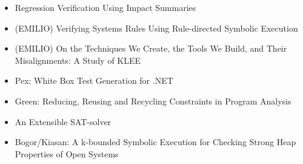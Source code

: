 \documentclass[10pt, a4paper]{article}
\begin{document}
\begin{itemize}
  \item \cite{BPR-SPIN13} Regression Verification Using Impact Summaries
  \item (EMILIO) \cite{CHW-ASPLOS13} Verifying Systems Rules Using Rule-directed Symbolic Execution
  \item \cite{RED-ICSE16} (EMILIO) On the Techniques We Create, the Tools We Build, and Their Misalignments: A Study of KLEE
  \item \cite{PEX-TAP08} Pex: White Box Test Generation for .NET
  \item \cite{VGD-FSE12} Green: Reducing, Reusing and Recycling Constraints in Program Analysis
  \item \cite{ES-SAT03} An Extensible SAT-solver
  \item \cite{DL-ASE06} Bogor/Kiasan: A k-bounded Symbolic Execution for Checking Strong Heap Properties of Open Systems
\end{itemize}
\end{document}
